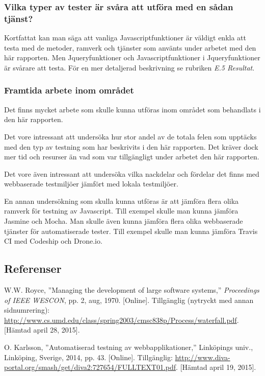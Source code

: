 \subsubsection{Vilka typer av tester är svåra att utföra 
med en sådan tjänst?}
Kortfattat kan man säga att vanliga Javascriptfunktioner är
väldigt enkla att testa med de metoder, ramverk och tjänster som
använts under arbetet med den här rapporten. Men Jqueryfunktioner och
Javascriptfunktioner i Jqueryfunktioner är svårare att
testa. För en mer detaljerad beskrivning se rubriken \emph{E.5 Resultat}.

\subsubsection{Framtida arbete inom området}
Det finns mycket arbete som skulle kunna utföras inom området som behandlats
i den här rapporten.

Det vore intressant att undersöka hur stor andel av de totala felen
som upptäcks med den typ av testning som har beskrivits i den här rapporten.
Det kräver dock mer tid och resurser än vad som var tillgängligt under
arbetet den här rapporten.

Det vore även intressant att undersöka vilka nackdelar och fördelar det
finns med webbaserade testmiljöer jämfört med lokala
testmiljöer.

En annan undersökning som skulla kunna utföras är att jämföra
flera olika ramverk för testning av Javascript. Till exempel skulle
man kunna jämföra Jasmine och Mocha. Man skulle även kunna jämföra
flera olika webbaserade tjänster för automatiserade tester. Till
exempel skulle man kunna jämföra Travis CI med Codeship och Drone.io.

\subsection{Referenser}
\vspace{-9mm}
\renewcommand{\refname}{}
\begin{thebibliography}{9}

W.W. Royce, ''Managing the development of large software systems,''
\textit{Proceedings of IEEE WESCON}, pp. 2, aug, 1970.
[Online].
Tillgänglig (nytryckt med annan sidnumrering):
\url{http://www.cs.umd.edu/class/spring2003/cmsc838p/Process/waterfall.pdf}.
[Hämtad april 28, 2015].

O. Karlsson, ''Automatiserad testning av webbapplikationer,''
Linköpings univ., Linköping, Sverige, 2014, pp. 43.
[Online]. 
Tillgänglig: 
\url{http://www.diva-portal.org/smash/get/diva2:727654/FULLTEXT01.pdf}.
[Hämtad april 19, 2015].

\end{thebibliography}
